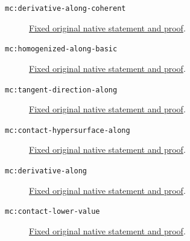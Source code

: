 \begin{description}
\item[\texttt{mc:derivative-along-coherent}]\label{mc:derivative-along-coherent}
\href{https://github.com/MingchenXia/archon-nakamaye/blob/53bb34a4a1607f358638012e2d9cb1d27818ca91/TranscendentalNakamaye/blueprint/src/maximal-contact.tex#L1738}{Fixed original native statement and proof}.
\item[\texttt{mc:homogenized-along-basic}]\label{mc:homogenized-along-basic}
\href{https://github.com/MingchenXia/archon-nakamaye/blob/53bb34a4a1607f358638012e2d9cb1d27818ca91/TranscendentalNakamaye/blueprint/src/maximal-contact.tex#L1926}{Fixed original native statement and proof}.
\item[\texttt{mc:tangent-direction-along}]\label{mc:tangent-direction-along}
\href{https://github.com/MingchenXia/archon-nakamaye/blob/53bb34a4a1607f358638012e2d9cb1d27818ca91/TranscendentalNakamaye/blueprint/src/maximal-contact.tex#L1758}{Fixed original native statement and proof}.
\item[\texttt{mc:contact-hypersurface-along}]\label{mc:contact-hypersurface-along}
\href{https://github.com/MingchenXia/archon-nakamaye/blob/53bb34a4a1607f358638012e2d9cb1d27818ca91/TranscendentalNakamaye/blueprint/src/maximal-contact.tex#L1810}{Fixed original native statement and proof}.
\item[\texttt{mc:derivative-along}]\label{mc:derivative-along}
\href{https://github.com/MingchenXia/archon-nakamaye/blob/53bb34a4a1607f358638012e2d9cb1d27818ca91/TranscendentalNakamaye/blueprint/src/maximal-contact.tex#L1654}{Fixed original native statement and proof}.
\item[\texttt{mc:contact-lower-value}]\label{mc:contact-lower-value}
\href{https://github.com/MingchenXia/archon-nakamaye/blob/53bb34a4a1607f358638012e2d9cb1d27818ca91/TranscendentalNakamaye/blueprint/src/maximal-contact.tex#L4282}{Fixed original native statement and proof}.
\end{description}
